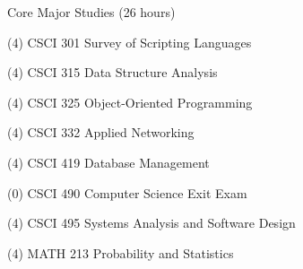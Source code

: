
\begin{reqgroup}{Core Major Studies (26 hours)}
\begin{checklist}
\begin{minipage}{0.5\linewidth}
	\item (4) CSCI 301	Survey of Scripting Languages
	\item (4) CSCI 315	Data Structure Analysis
	\item (4) CSCI 325	Object-Oriented Programming
	\item (4) CSCI 332	Applied Networking
\end{minipage}
\begin{minipage}{0.5\linewidth}
	\item (4) CSCI 419	Database Management
	\item (0) CSCI 490	Computer Science Exit Exam
	\item (4) CSCI 495	Systems Analysis and Software Design
	\item (4) MATH 213	Probability and Statistics
	\end{minipage}
\end{checklist}
\end{reqgroup}

